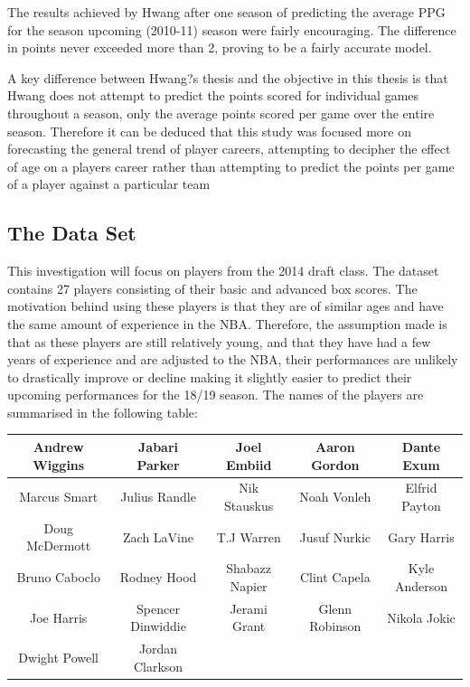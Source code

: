 \documentclass[a4paper,11pt,twoside]{article}
\begin{document}
The results achieved by Hwang after one season of predicting the average PPG for the season upcoming (2010-11) season were fairly encouraging. The difference in points never exceeded more than 2, proving to be a fairly accurate model.

A key difference between Hwang?s thesis and the objective in this thesis is that Hwang does not attempt to predict the points scored for individual games throughout a season, only the average points scored per game over the entire season. Therefore it can be deduced that this study was focused more on forecasting the general trend of player careers, attempting to decipher the effect of age on a players career rather than attempting to predict the points per game of a player against a particular team

\subsection{The Data Set}
This investigation will focus on players from the 2014 draft class. The dataset contains 27 players consisting of their basic and advanced box scores. The motivation behind using these players is that they are of similar ages and have the same amount of experience in the NBA. Therefore, the assumption made is that as these players are still relatively young, and that they have had a few years of experience and are adjusted to the NBA, their performances are unlikely to drastically improve or decline making it slightly easier to predict their upcoming performances for the 18/19 season. The names of the players are summarised in the following table:

\vspace{5mm}
\begin{center}
\begin{tabular}{ ccccc } 
 \hline
Andrew Wiggins & Jabari Parker & Joel Embiid & Aaron  Gordon& Dante Exum \\ 
 \hline
Marcus Smart & Julius Randle & Nik Stauskus & Noah Vonleh & Elfrid Payton \\ 
 \hline
 Doug McDermott & Zach LaVine & T.J Warren & Jusuf Nurkic & Gary Harris\\
 \hline
 Bruno Caboclo & Rodney Hood & Shabazz Napier & Clint Capela & Kyle Anderson\\
 \hline 
 Joe Harris & Spencer Dinwiddie & Jerami Grant & Glenn Robinson & Nikola Jokic\\
 \hline
 Dwight Powell & Jordan Clarkson\\
\hline
\end{tabular}
\end{center}
\end{document}
